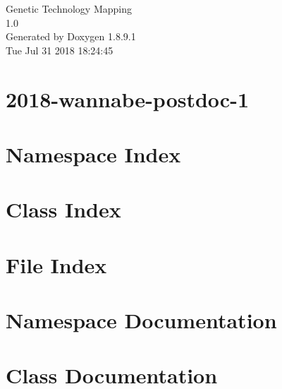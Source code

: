 \documentclass[twoside]{book}
\newcommand{\+}{\discretionary{\mbox{\scriptsize$\hookleftarrow$}}{}{}}
\newcommand{\clearemptydoublepage}{%
  \newpage{\pagestyle{empty}\cleardoublepage}%
}
\begin{document}
\hypersetup{pageanchor=false,
             bookmarks=true,
             bookmarksnumbered=true,
             pdfencoding=unicode
            }
\begin{titlepage}
\vspace*{7cm}
\begin{center}%
{\Large Genetic Technology Mapping \\[1ex]\large 1.\+0 }\\
\vspace*{1cm}
{\large Generated by Doxygen 1.8.9.1}\\
\vspace*{0.5cm}
{\small Tue Jul 31 2018 18:24:45}\\
\end{center}
\end{titlepage}
\clearemptydoublepage
\tableofcontents
\clearemptydoublepage
{}
\hypersetup{pageanchor=true}

\chapter{2018-\/wannabe-\/postdoc-\/1}
\label{md_README}
\hypertarget{md_README}{}

\chapter{Namespace Index}

\chapter{Class Index}

\chapter{File Index}

\chapter{Namespace Documentation}









\chapter{Class Documentation}






\end{document}
